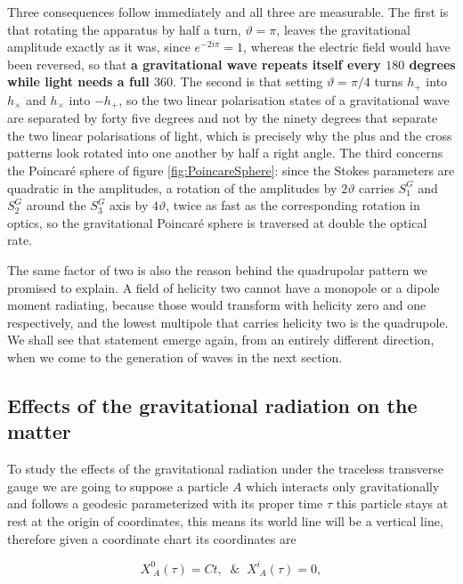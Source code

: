             Three consequences follow immediately and all three are measurable. The first is that rotating the apparatus by half a turn, $\vartheta=\pi$, leaves the gravitational amplitude exactly as it was, since $e^{-2i\pi}=1$, whereas the electric field would have been reversed, so that \textbf{a gravitational wave repeats itself every $180$ degrees while light needs a full $360$}. The second is that setting $\vartheta = \pi/4$ turns $h_+$ into $h_{\times}$ and $h_{\times}$ into $-h_+$, so the two linear polarisation states of a gravitational wave are separated by forty five degrees and not by the ninety degrees that separate the two linear polarisations of light, which is precisely why the plus and the cross patterns look rotated into one another by half a right angle. The third concerns the Poincaré sphere of figure \ref{fig:PoincareSphere}: since the Stokes parameters are quadratic in the amplitudes, a rotation of the amplitudes by $2\vartheta$ carries $S^G_1$ and $S^G_2$ around the $S^G_3$ axis by $4\vartheta$, twice as fast as the corresponding rotation in optics, so the gravitational Poincaré sphere is traversed at double the optical rate.

            The same factor of two is also the reason behind the quadrupolar pattern we promised to explain. A field of helicity two cannot have a monopole or a dipole moment radiating, because those would transform with helicity zero and one respectively, and the lowest multipole that carries helicity two is the quadrupole. We shall see that statement emerge again, from an entirely different direction, when we come to the generation of waves in the next section.

    \subsection{Effects of the gravitational radiation on the matter}

        To study the effects of the gravitational radiation under the traceless transverse gauge we are going to suppose a particle $A$ which interacts only gravitationally and follows a geodesic parameterized with its proper time $\tau$ this particle stays at rest at the origin of coordinates, this means its world line will be a vertical line, therefore given a coordinate chart its coordinates are

        \begin{equation}
            X^0_{\;A}(\tau)=C t,\;\;\&\;\; X^i_{\;A}(\tau)=0,
        \end{equation}

